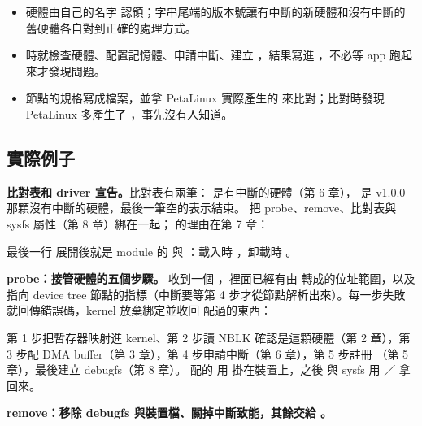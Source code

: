 \begin{gain}
\begin{itemize}
\item 硬體由自己的名字  認領；字串尾端的版本號讓有中斷的新硬體和沒有中斷的舊硬體各自對到正確的處理方式。
\item {} 時就檢查硬體、配置記憶體、申請中斷、建立 ，結果寫進 ，不必等 app 跑起來才發現問題。
\item 節點的規格寫成檔案，並拿 PetaLinux 實際產生的  來比對；比對時發現 PetaLinux 多產生了 ，事先沒有人知道。
\end{itemize}
\end{gain}

\subsection{實際例子}

\textbf{比對表和 driver 宣告。}比對表有兩筆： 是有中斷的硬體（第 6 章）， 是 v1.0.0 那顆沒有中斷的硬體，最後一筆空的表示結束。 把 probe、remove、比對表與 sysfs 屬性（第 8 章）綁在一起； 的理由在第 7 章：


最後一行  展開後就是 module 的  與 ：載入時 ，卸載時 。

\textbf{probe：接管硬體的五個步驟。} 收到一個 ，裡面已經有由  轉成的位址範圍，以及指向 device tree 節點的指標（中斷要等第 4 步才從節點解析出來）。每一步失敗就回傳錯誤碼，kernel 放棄綁定並收回  配過的東西：


第 1 步把暫存器映射進 kernel、第 2 步讀 NBLK 確認是這顆硬體（第 2 章），第 3 步配 DMA buffer（第 3 章），第 4 步申請中斷（第 6 章），第 5 步註冊 （第 5 章），最後建立 debugfs（第 8 章）。 配的  用  掛在裝置上，之後  與 sysfs 用 ／ 拿回來。

\textbf{remove：移除 debugfs 與裝置檔、關掉中斷致能，其餘交給 。}


